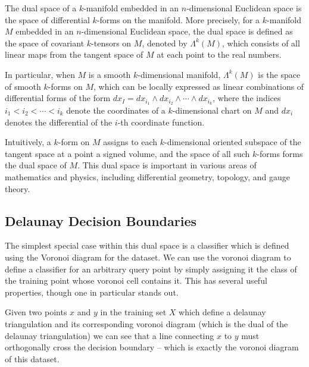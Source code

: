 The dual space of a $k$-manifold embedded in an $n$-dimensional Euclidean space is the space of differential $k$-forms on the manifold. More precisely, for a $k$-manifold $M$ embedded in an $n$-dimensional Euclidean space, the dual space is defined as the space of covariant $k$-tensors on $M$, denoted by $\Lambda^k(M)$, which consists of all linear maps from the tangent space of $M$ at each point to the real numbers.

In particular, when $M$ is a smooth $k$-dimensional manifold, $\Lambda^k(M)$ is the space of smooth $k$-forms on $M$, which can be locally expressed as linear combinations of differential forms of the form $dx_I = dx_{i_1} \wedge dx_{i_2} \wedge \cdots \wedge dx_{i_k}$, where the indices $i_1 < i_2 < \cdots < i_k$ denote the coordinates of a $k$-dimensional chart on $M$ and $dx_i$ denotes the differential of the $i$-th coordinate function.

Intuitively, a $k$-form on $M$ assigns to each $k$-dimensional oriented subspace of the tangent space at a point a signed volume, and the space of all such $k$-forms forms the dual space of $M$. This dual space is important in various areas of mathematics and physics, including differential geometry, topology, and gauge theory.

\subsection{Delaunay Decision Boundaries}

The simplest special case within this dual space is a classifier which
is defined using the Voronoi diagram for the dataset. We can use the
voronoi diagram to define a classifier for an arbitrary query point by
simply assigning it the class of the training point whose voronoi cell
contains it. This has several useful properties, though one in
particular stands out.

Given two points $x$ and $y$ in the training set $X$ which define a delaunay
triangulation and its corresponding voronoi diagram (which is the dual
of the delaunay triangulation) we can see that a line connecting $x$ to
$y$ must orthogonally cross the decision boundary -- which is exactly the voronoi
diagram of this dataset.

